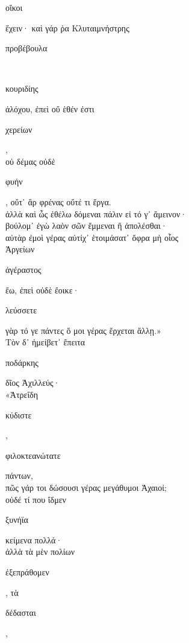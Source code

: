 \documentclass{ransom}
\begin{document}
\renewcommand{\rightheaderwhat}{\rightheaderwhatglosses}%
\begin{foreignpage}
\begin{graytext}
\begin{whitetext}οἴκοι\end{whitetext} ἔχειν· καὶ γάρ ῥα Κλυταιμνήστρης \begin{whitetext}προβέβουλα\end{whitetext}\\
\begin{whitetext}κουριδίης\end{whitetext} ἀλόχου, ἐπεὶ οὔ ἑθέν ἐστι \begin{whitetext}χερείων\end{whitetext},\\
οὐ δέμας οὐδὲ \begin{whitetext}φυήν\end{whitetext}, οὔτ᾽ ἂρ φρένας οὔτέ τι ἔργα.\hfill{}\\
ἀλλὰ καὶ ὧς ἐθέλω δόμεναι πάλιν εἰ τό γ᾽ ἄμεινον·\\
βούλομ᾽ ἐγὼ λαὸν σῶν ἔμμεναι ἢ ἀπολέσθαι·\\
αὐτὰρ ἐμοὶ γέρας αὐτίχ᾽ ἑτοιμάσατ᾽ ὄφρα μὴ οἶος\\
Ἀργείων \begin{whitetext}ἀγέραστος\end{whitetext} ἔω, ἐπεὶ οὐδὲ ἔοικε·\\
\begin{whitetext}λεύσσετε\end{whitetext} γὰρ τό γε πάντες ὅ μοι γέρας ἔρχεται ἄλλῃ.»\hfill{}\\
Τὸν δ᾽ ἠμείβετ᾽ ἔπειτα \begin{whitetext}ποδάρκης\end{whitetext} δῖος Ἀχιλλεύς·\\
«Ἀτρεΐδη \begin{whitetext}κύδιστε\end{whitetext}, \begin{whitetext}φιλοκτεανώτατε\end{whitetext} πάντων,\\
πῶς γάρ τοι δώσουσι γέρας μεγάθυμοι Ἀχαιοί;\\
οὐδέ τί που ἴδμεν \begin{whitetext}ξυνήϊα\end{whitetext} κείμενα πολλά·\\
ἀλλὰ τὰ μὲν πολίων \begin{whitetext}ἐξεπράθομεν\end{whitetext}, τὰ \begin{whitetext}δέδασται\end{whitetext},\hfill{}\\

\end{graytext}
\end{foreignpage}
\end{document}
